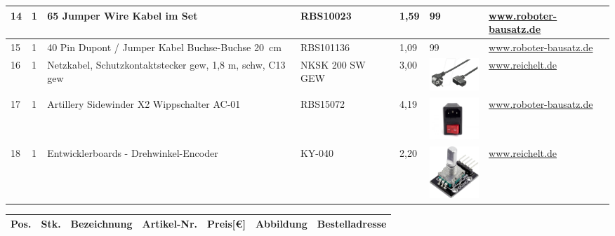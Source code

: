 \begin{center}
\begin{tabularx}{\textwidth}{|p{0.4cm}|p{0.4cm}|X|X|p{1cm}|X|X|}
		\hline
		14 & 1 & 65 Jumper Wire Kabel im Set & RBS10023 & 1,59  & 99 & \href{https://www.roboter-bausatz.de/p/65-jumper-wire-kabel-im-set}{www.roboter-bausatz.de} \\
		\hline
		15 & 1 & 40 Pin Dupont / Jumper Kabel Buchse-Buchse 20\ cm & RBS101136 & 1,09  & 99 & \href{https://www.roboter-bausatz.de/p/40-pin-dupont-jumper-kabel-buchse-buchse-20-cm}{www.roboter-bausatz.de} \\
		\hline
		16 & 1 & Netzkabel, Schutzkontaktstecker gew, 1,8 m, schw, C13 gew & NKSK 200 SW GEW & 3,00  & \includegraphics[width=2cm]{Images/Material/NKSK200SWGEW.png} & \href{https://www.reichelt.de/sg/de/netzkabel-schutzkontaktstecker-gew-1-8-m-schw-c13-gew-nksk-200-sw-gew-p113125.html}{www.reichelt.de} \\
		\hline
		17 & 1 & Artillery Sidewinder X2 Wippschalter AC-01 & RBS15072 & 4,19  & \includegraphics[width=2cm]{Images/Material/RBS15072.jpg} & \href{https://www.roboter-bausatz.de/p/artillery-sidewinder-x2-wippschalter-ac-01}{www.roboter-bausatz.de} \\
		\hline
		18 & 1 & Entwicklerboards - Drehwinkel-Encoder & KY-040 & 2,20  & \includegraphics[width=2cm]{Images/Material/DEBOENCODER.png} & \href{https://www.reichelt.de/sg/de/entwicklerboards-drehwinkel-encoder-ky-040-debo-encoder-p282545.html}{www.reichelt.de} \\
		\hline
		
						\end{tabularx}
		
		\fontsize{8}{10}\selectfont
		\begin{tabularx}{\textwidth}{|p{0.4cm}|p{0.4cm}|X|X|p{1cm}|X|X|}
		\hline 
		\textbf{Pos.} & \textbf{Stk.} & \textbf{Bezeichnung} & \textbf{Artikel-Nr.}& \textbf{Preis[€]} & \textbf{Abbildung} & \textbf{Bestelladresse} \\ \hline	
		

\end{tabularx}
\end{center}
